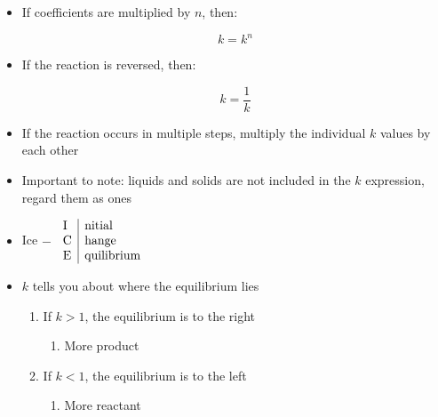 \documentclass[12pt]{article}
\begin{document}
\begin{itemize}
\begin{enumerate}
    \end{enumerate}

  \item If coefficients are multiplied by $n$, then:

    \begin{equation}
      k=k^n
      \label{2}
    \end{equation}

  \item If the reaction is reversed, then:

    \begin{equation}
      k=\frac{1}{k}
      \label{3}
    \end{equation}

  \item If the reaction occurs in multiple steps, multiply the individual $k$ values by each other

  \item Important to note: liquids and solids are not included in the $k$ expression, regard them as ones

  \item Ice $-$ $\begin{array}{l | l} \text{I} & \text{nitial} \\ \text{C} & \text{hange}\\ \text{E} & \text{quilibrium}\\ \end{array}$

  \item $k$ tells you about where the equilibrium lies

    \begin{enumerate}

      \item If $k>1$, the equilibrium is to the right

        \begin{enumerate}

          \item More product

        \end{enumerate}

      \item If $k<1$, the equilibrium is to the left

        \begin{enumerate}

          \item More reactant

        \end{enumerate}


\end{enumerate}
\end{itemize}
\end{document}
